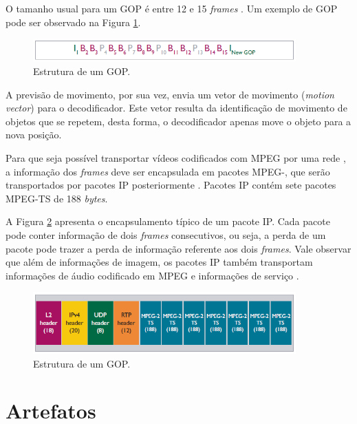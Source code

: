 O tamanho usual para um GOP é entre 12 e 15 \emph{frames} \cite{ciscoieee, mpeg2ref}. Um exemplo de GOP pode ser observado na Figura \ref{fig:gop}.

\begin{figure}[!htb]
	\centering
	\includegraphics[width=0.9\textwidth]{./imgs/gop.png}
	\caption{Estrutura de um GOP.}
	\label{fig:gop}
\end{figure}

A previsão de movimento, por sua vez, envia um vetor de movimento (\emph{motion vector}) para o decodificador. Este vetor resulta da identificação de movimento de objetos que se repetem, desta forma, o decodificador apenas move o objeto para a nova posição.

Para que seja possível transportar vídeos codificados com MPEG por uma rede , a informação dos \emph{frames} deve ser encapsulada em pacotes MPEG-, que serão transportados por pacotes IP posteriormente \cite{ciscoieee}. Pacotes IP contém sete pacotes MPEG-TS de 188 \emph{bytes}. 

A Figura \ref{fig:ts} apresenta o encapsulamento típico de um pacote IP. Cada pacote pode conter informação de dois \emph{frames} consecutivos, ou seja, a perda de um pacote pode trazer a perda de informação referente aos dois \emph{frames}. Vale observar que além de informações de imagem, os pacotes IP também transportam informações de áudio codificado em MPEG e informações de serviço \cite{ciscoieee}.

\begin{figure}[!htb]
	\centering
	\includegraphics[width=0.9\textwidth]{./imgs/ts.png}
	\caption{Estrutura de um GOP.}
	\label{fig:ts}
\end{figure}

\section{Artefatos}

